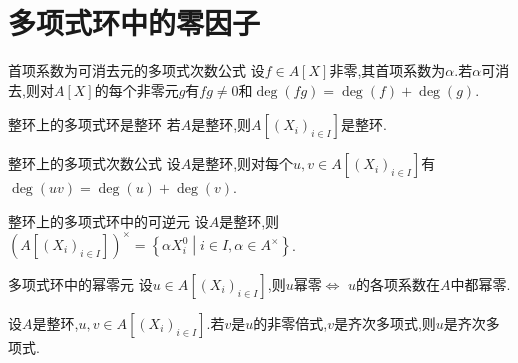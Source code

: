 \section{多项式环中的零因子}

\begin{proposition}{首项系数为可消去元的多项式次数公式}{}
	设$f\in A[X]$非零,其首项系数为$\alpha$.若$\alpha$可消去,则对$A[X]$的每个非零元$g$有$fg\neq 0$和$\deg\left(fg\right)=\deg\left(f\right)+\deg\left(g\right)$.
\end{proposition}

\begin{proposition}{整环上的多项式环是整环}{}
	若$A$是整环,则$A[(X_{i})_{i\in I}]$是整环.
\end{proposition}

\begin{corollary}{整环上的多项式次数公式}{}
	设$A$是整环,则对每个$u,v\in A[(X_{i})_{i\in I}]$有$\deg\left(uv\right)=\deg\left(u\right)+\deg\left(v\right)$.
\end{corollary}

\begin{corollary}{整环上的多项式环中的可逆元}{}
	设$A$是整环,则$\left(A[(X_{i})_{i\in I}]\right)^{\times}=\left\{\alpha X_{i}^{0}\middle|i\in I,\alpha\in A^{\times}\right\}$.
\end{corollary}

\begin{proposition}{多项式环中的幂零元}{}
	设$u\in A[(X_{i})_{i\in I}]$,则$u$幂零$\iff$ $u$的各项系数在$A$中都幂零.
\end{proposition}

\begin{remark}{}{}
	设$A$是整环,$u,v\in A[(X_{i})_{i\in I}]$.若$v$是$u$的非零倍式,$v$是齐次多项式,则$u$是齐次多项式.
\end{remark}


















